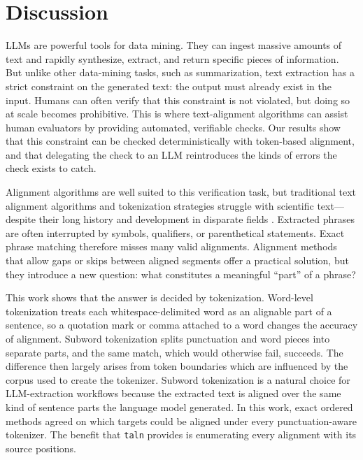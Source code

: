 \documentclass[pdflatex,lineno,referee,sn-vancouver-num]{sn-jnl}
\theoremstyle{thmstyleone}
\theoremstyle{thmstylethree}
\theoremstyle{thmstyletwo}
\begin{document}
\section{Discussion}
LLMs are powerful tools for data mining. They can ingest massive amounts of text and rapidly synthesize, extract, and return specific pieces of information. But unlike other data-mining tasks, such as summarization, text extraction has a strict constraint on the generated text: the output must already exist in the input. Humans can often verify that this constraint is not violated, but doing so at scale becomes prohibitive. This is where text-alignment algorithms can assist human evaluators by providing automated, verifiable checks. Our results show that this constraint can be checked deterministically with token-based alignment, and that delegating the check to an LLM reintroduces the kinds of errors the check exists to catch.

Alignment algorithms are well suited to this verification task, but traditional text alignment algorithms and tokenization strategies struggle with scientific text---despite their long history and development in disparate fields \citep{hirschberg1975lcs, KnuthMorrisPratt1977, Melsted2021, sennrich2016neuralmachinetranslationrare, Sullivan2025}. Extracted phrases are often interrupted by symbols, qualifiers, or parenthetical statements. Exact phrase matching therefore misses many valid alignments. Alignment methods that allow gaps or skips between aligned segments offer a practical solution, but they introduce a new question: what constitutes a meaningful ``part'' of a phrase?

This work shows that the answer is decided by tokenization. Word-level tokenization treats each whitespace-delimited word as an alignable part of a sentence, so a quotation mark or comma attached to a word changes the accuracy of alignment. Subword tokenization splits punctuation and word pieces into separate parts, and the same match, which would otherwise fail, succeeds. The difference then largely arises from token boundaries which are influenced by the corpus used to create the tokenizer. Subword tokenization is a natural choice for LLM-extraction workflows because the extracted text is aligned over the same kind of sentence parts the language model generated. In this work, exact ordered methods agreed on which targets could be aligned under every punctuation-aware tokenizer. The benefit that \texttt{taln} provides is enumerating every alignment with its source positions.
\end{document}

